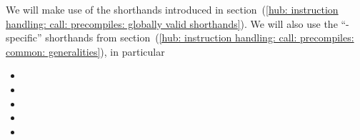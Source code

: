 We will make use of the shorthands introduced in
section~(\ref{hub: instruction handling: call: precompiles: globally valid shorthands}).
We will also use the ``\instEcrecover{}-specific'' shorthands from
section~(\ref{hub: instruction handling: call: precompiles: common: generalities}),
in particular
\begin{itemize}
	\item \locAddressRecoveryFailure           {}
	\item \locAddressRecoverySuccess           {}
	\item \locOobPVerifySufficientGasWrongCds  {}
	\item \locSignatureVerificationFailure     {}
	\item \locSignatureVerificationSuccess     {}
\end{itemize}
